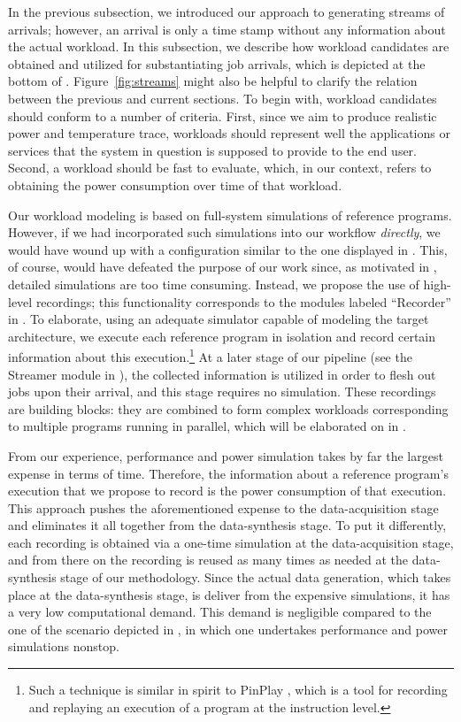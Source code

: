 
In the previous subsection, we introduced our approach to generating streams of
arrivals; however, an arrival is only a time stamp without any information about
the actual workload. In this subsection, we describe how workload candidates are
obtained and utilized for substantiating job arrivals, which is depicted at the
bottom of . Figure~\ref{fig:streams} might also be helpful to
clarify the relation between the previous and current sections. To begin with,
workload candidates should conform to a number of criteria. First, since we aim
to produce realistic power and temperature trace, workloads should represent
well the applications or services that the system in question is supposed to
provide to the end user. Second, a workload should be fast to evaluate, which,
in our context, refers to obtaining the power consumption over time of that
workload.

Our workload modeling is based on full-system simulations of reference programs.
However, if we had incorporated such simulations into our workflow
\emph{directly}, we would have wound up with a configuration similar to the one
displayed in . This, of course, would have defeated the
purpose of our work since, as motivated in , detailed
simulations are too time consuming. Instead, we propose the use of high-level
recordings; this functionality corresponds to the modules labeled ``Recorder''
in . To elaborate, using an adequate simulator capable of
modeling the target architecture, we execute each reference program in isolation
and record certain information about this execution.\footnote{Such a technique
is similar in spirit to PinPlay \cite{patil2010}, which is a tool for recording
and replaying an execution of a program at the instruction level.} At a later
stage of our pipeline (see the Streamer module in ), the
collected information is utilized in order to flesh out jobs upon their arrival,
and this stage requires no simulation. These recordings are building blocks:
they are combined to form complex workloads corresponding to multiple programs
running in parallel, which will be elaborated on in .

From our experience, performance and power simulation takes by far the largest
expense in terms of time. Therefore, the information about a reference program's
execution that we propose to record is the power consumption of that execution.
This approach pushes the aforementioned expense to the data-acquisition stage
and eliminates it all together from the data-synthesis stage. To put it
differently, each recording is obtained via a one-time simulation at the
data-acquisition stage, and from there on the recording is reused as many times
as needed at the data-synthesis stage of our methodology. Since the actual data
generation, which takes place at the data-synthesis stage, is deliver from the
expensive simulations, it has a very low computational demand. This demand is
negligible compared to the one of the scenario depicted in ,
in which one undertakes performance and power simulations nonstop.


